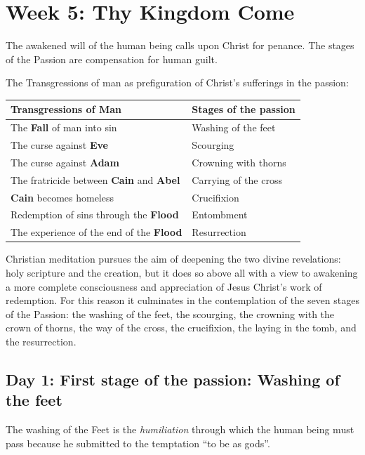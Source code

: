 \chapter{Week 5: Thy Kingdom Come}

The awakened will of the human being calls upon Christ for penance. The stages of the Passion are compensation for human guilt.

The Transgressions of man as prefiguration of Christ's sufferings in the passion:

\begin{table}[h]\small\centering
\begin{tabular}{ll}\toprule
\textbf{Transgressions of Man} &
\textbf{Stages of the passion}\\\midrule
The \textbf{Fall} of man into sin &
Washing of the feet\\
The curse against \textbf{Eve} &
Scourging\\
The curse against \textbf{Adam} &
Crowning with thorns\\
The fratricide between \textbf{Cain} and \textbf{Abel} &
Carrying of the cross\\
\textbf{Cain} becomes homeless &
Crucifixion\\
Redemption of sins through the \textbf{Flood} &
Entombment\\
The experience of the end of the \textbf{Flood} &
Resurrection\\\bottomrule
\end{tabular}
\end{table}

\begin{quotex}
Christian meditation pursues the aim of deepening the two divine revelations: holy scripture and the creation, but it does so above all with a view to awakening a more complete consciousness and appreciation of Jesus Christ's work of redemption. For this reason it culminates in the contemplation of the seven stages of the Passion: the washing of the feet, the scourging, the crowning with the crown of thorns, the way of the cross, the crucifixion, the laying in the tomb, and the resurrection. 

\end{quotex}

\section{Day 1: First stage of the passion: Washing of the feet}
The washing of the Feet is the \emph{humiliation} through which the human being must pass because he submitted to the temptation ``to be as gods''.

